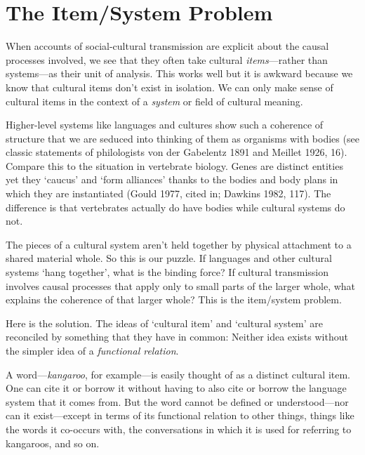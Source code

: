 

\chapter{The Item/System Problem}


When accounts of social-cultural transmission are explicit about the 
causal processes involved, we see that they often take cultural \textit{
items}---rather than systems---as their unit of analysis. This works well 
but it is awkward because we know that cultural items don't exist in 
isolation. We can only make sense of cultural items in the context of a 
\textit{system} or field of cultural meaning. 



Higher-level systems like languages and cultures show such a coherence 
of structure that we are seduced into thinking of them as organisms with 
bodies (see classic statements of philologists von der Gabelentz 1891 
and Meillet 1926, 16). Compare this to the situation in vertebrate 
biology. Genes are distinct entities yet they \textquoteleft caucus' and \textquoteleft form 
alliances' thanks to the bodies and body plans in which they are 
instantiated (Gould 1977, cited in; Dawkins 1982, 117). The difference 
is that vertebrates actually do have bodies while cultural systems 
do not. 



The pieces of a cultural system aren't held together by physical 
attachment to a shared material whole. So this is our puzzle. If 
languages and other cultural systems \textquoteleft hang together', what is the 
binding force? If cultural transmission involves causal processes that 
apply only to small parts of the larger whole, what explains the 
coherence of that larger whole? This is the item/system problem.



Here is the solution. The ideas of \textquoteleft cultural item' 
and \textquoteleft cultural system' are reconciled by something that they have in 
common: Neither idea exists without the simpler idea of a \textit{
functional relation}. 



A word---\textit{kangaroo}, for example---is easily thought of as a 
distinct cultural item. One can cite it or borrow it without having to 
also cite or borrow the language system that it comes from. But the word 
cannot be defined or understood---nor can it exist---except in terms of its 
functional relation to other things, things like the words it co-occurs 
with, the conversations in which it is used for referring to kangaroos, 
and so on. 



